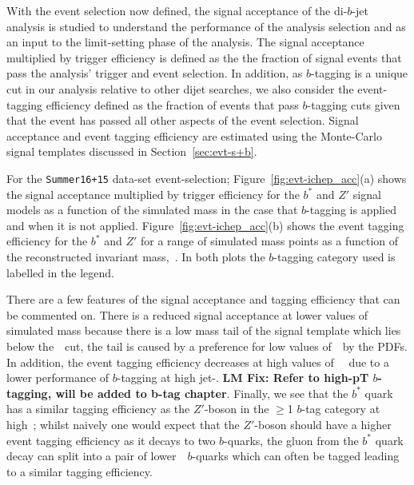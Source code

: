 With the event selection now defined,
the signal acceptance of the di-$b$-jet analysis is studied
to understand the performance of the analysis selection
and as an input to the limit-setting phase of the analysis.
The signal acceptance multiplied by trigger efficiency is defined as the 
the fraction of signal events that pass the analysis' trigger and event selection.
In addition, as $b$-tagging is a unique cut in our analysis relative to other dijet searches,
we also consider the event-tagging efficiency defined as the fraction of events that pass
$b$-tagging cuts given that the event has passed all other aspects of the event selection.
Signal acceptance and event tagging efficiency are estimated using the
Monte-Carlo signal templates discussed in Section~\ref{sec:evt-s+b}.

For the \verb|Summer16+15| data-set event-selection;
Figure~\ref{fig:evt-ichep_acc}(a) shows the signal acceptance multiplied by trigger efficiency
for the $b^*$ and $Z'$ signal models
as a function of the simulated mass
in the case that $b$-tagging is applied and when it is not applied.
Figure~\ref{fig:evt-ichep_acc}(b) shows the event tagging efficiency
for the $b^*$ and $Z'$ for a range of simulated mass points
as a function of the reconstructed invariant mass,~\mjj.
In both plots the $b$-tagging category used is labelled in the legend.

There are a few features of the signal acceptance and tagging efficiency that can be commented on.
There is a reduced signal acceptance at lower values of simulated mass
because there is a low mass tail of the signal template which lies below the~\mjj~cut,
the tail is caused by a preference for low values of~\mjj~by the PDFs.
In addition, the event tagging efficiency decreases at high values of~\mjj~
due to a lower performance of $b$-tagging at high jet-\pT.
\textbf{LM Fix: Refer to high-pT $b$-tagging, will be added to b-tag chapter}.
Finally, we see that the $b^*$ quark has a similar tagging efficiency
as the $Z'$-boson in the $\geq$1 $b$-tag category at high~\mjj;
whilst naively one would expect that the $Z'$-boson should have a higher
event tagging efficiency as it decays to two $b$-quarks,
the gluon from the $b^*$ quark decay can split into a pair of lower~\pT~$b$-quarks
which can often be tagged leading to a similar tagging efficiency.

